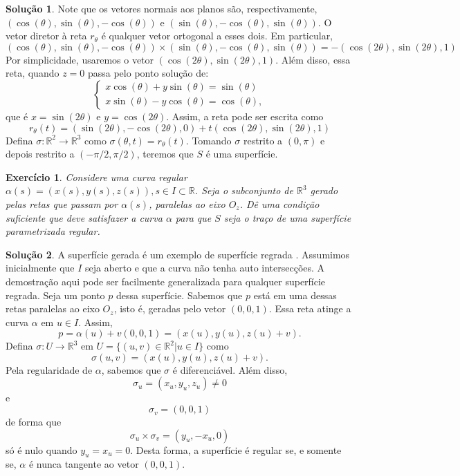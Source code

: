 \documentclass[a4paper,12pt]{article}
\newcommand{\R}{\mathbb{R}}
\theoremstyle{exer}
\newtheorem{exercise}{Exercício}
\theoremstyle{definition}
\newtheorem{solution}{Solução}
\theoremstyle{plain}
\begin{document}
\begin{solution}
    Note que os vetores normais aos planos são, respectivamente,
    $(\cos(\theta), \sin(\theta), -\cos(\theta))$ e $(\sin(\theta),
    -\cos(\theta), \sin(\theta))$. O vetor diretor à reta $r_{\theta}$ é
    qualquer vetor ortogonal a esses dois. Em particular, 
    $$
    (\cos(\theta), \sin(\theta), -\cos(\theta)) \times (\sin(\theta),
    -\cos(\theta), \sin(\theta)) = -(\cos(2\theta), \sin(2\theta), 1) 
    $$
    Por simplicidade, usaremos o vetor $(\cos(2\theta), \sin(2\theta), 1)$.
    Além disso, essa reta, quando $z = 0$ passa pelo ponto solução de:
    $$
    \begin{cases}
      x\cos(\theta) + y\sin(\theta) = \sin(\theta) \\
      x\sin(\theta) - y\cos(\theta) = \cos(\theta), 
    \end{cases}
    $$
    que é $x = \sin(2\theta)$ e $y = \cos(2\theta)$. Assim, a reta pode ser
    escrita como 
    $$
    r_{\theta}(t) = (\sin(2\theta), -\cos(2\theta), 0) + t(\cos(2\theta), \sin(2\theta), 1)
    $$
    Defina $\sigma : \R^2 \to \R^3$ como $\sigma(\theta, t) = r_{\theta}(t)$.
    Tomando $\sigma$ restrito a $(0,\pi)$ e depois restrito a $(-\pi/2,
    \pi/2)$, teremos que $S$ é uma superfície. 
\end{solution}

\begin{exercise}
    Considere uma curva regular $\alpha(s) = (x(s), y(s), z(s)), s \in I
    \subset \R$. Seja o subconjunto de $\R^3$ gerado pelas retas que passam
    por $\alpha(s)$, paralelas ao eixo $O_z$. Dê uma condição suficiente que
    deve satisfazer a curva $\alpha$ para que $S$ seja o traço de uma
    superfície parametrizada regular.
\end{exercise}

\begin{solution}
    A superfície gerada é um exemplo de superfície regrada \cite[Seção
    5.3]{pressley}. Assumimos inicialmente que $I$ seja aberto e que a curva
    não tenha auto intersecções. A demostração aqui pode ser facilmente
    generalizada para qualquer superfície regrada. Seja um ponto $p$ dessa superfície. Sabemos que $p$ está
    em uma dessas retas paralelas ao eixo $O_z$, isto é, geradas pelo vetor
    $(0,0,1)$. Essa reta atinge a curva $\alpha$ em $u \in I$. Assim, 
    $$
    p = \alpha(u) + v(0,0,1) = (x(u), y(u), z(u) + v).
    $$
    Defina $\sigma : U \to \R^3$ em $U = \{(u,v) \in \R^2 | u \in I\}$ como 
    $$
    \sigma(u,v) = (x(u), y(u), z(u) + v).
    $$
    Pela regularidade de $\alpha$, sabemos que $\sigma$ é diferenciável. Além
    disso, 
    $$
    \sigma_u = (x_u, y_u, z_u) \neq 0
    $$
    e
    $$
    \sigma_v = (0,0,1)
    $$
    de forma que 
    $$
    \sigma_u \times \sigma_v = (y_u, -x_u, 0)
    $$
    só é nulo quando $y_u = x_u = 0$. Desta forma, a superfície é regular se, e
    somente se, $\alpha$ é nunca tangente ao vetor $(0,0,1)$. 

\end{solution}
\end{document}
